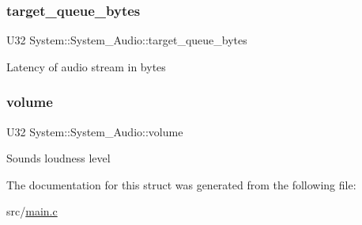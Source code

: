 \subsubsection{\texorpdfstring{target\_queue\_bytes}{target\_queue\_bytes}}
{\footnotesize\ttfamily U32 System\+::\+System\+\_\+\+Audio\+::target\+\_\+queue\+\_\+bytes}

Latency of audio stream in bytes \mbox{\label{structSystem_1_1System__Audio_ab8696100d5f38507ff5e91b7194747ca}} 
\subsubsection{\texorpdfstring{volume}{volume}}
{\footnotesize\ttfamily U32 System\+::\+System\+\_\+\+Audio\+::volume}

Sound\textquotesingle{}s loudness level 

The documentation for this struct was generated from the following file\+:\begin{DoxyCompactItemize}
\item 
src/\mbox{\hyperlink{main_8c}{main.\+c}}\end{DoxyCompactItemize}
